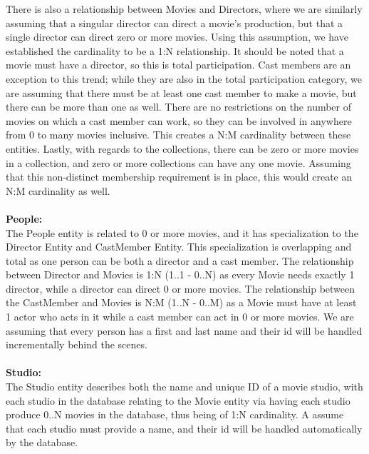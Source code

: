 \documentclass[12pt]{article}
\begin{document}
    There is also a relationship between Movies and Directors, where we are similarly assuming that a singular director can direct a movie’s production, but that a single director can direct zero or more movies. Using this assumption, we have established the cardinality to be a 1:N relationship. It should be noted that a movie must have a director, so this is total participation.
    Cast members are an exception to this trend; while they are also in the total participation category, we are assuming that there must be at least one cast member to make a movie, but there can be more than one as well. There are no restrictions on the number of movies on which a cast member can work, so they can be involved in anywhere from 0 to many movies inclusive. This creates a N:M cardinality between these entities.
    Lastly, with regards to the collections, there can be zero or more movies in a collection, and zero or more collections can have any one movie. Assuming that this non-distinct membership requirement is in place, this would create an N:M cardinality as well.\\ \\
    \textbf{People:} \\ The People entity is related to 0 or more movies, and it has specialization to the Director Entity and Cast\textunderscore Member Entity. This specialization is overlapping and total as one person can be both a director and a cast member. The relationship between Director and Movies is 1:N (1..1 - 0..N) as every Movie needs exactly 1 director, while a director can direct 0 or more movies. The relationship between the Cast\textunderscore Member and Movies is N:M (1..N - 0..M) as a Movie must have at least 1 actor who acts in it while a cast member can act in 0 or more movies. We are assuming that every person has a first and last name and their id will be handled incrementally behind the scenes. \\ \\
    \textbf{Studio:} \\ The Studio entity describes both the name and unique ID of a movie studio, with each studio in the database relating to the Movie entity via having each studio produce 0..N movies in the database, thus being of 1:N cardinality. A assume that each studio must provide a name, and their id will be handled automatically by the database.
\end{document}
